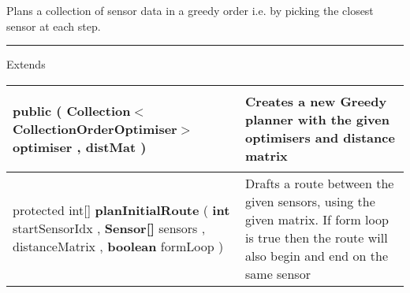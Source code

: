  {\scriptsize Plans a collection of sensor data in a greedy order\newline%
 i.e. by picking the closest sensor at each step.
 
\vspace*{4pt} \hrule \vspace*{3pt}
Extends \textbf{ \hyperref[tab:BaseCollectionOrderPlanner]{\color{blue}{BaseCollectionOrderPlanner}} }
\vspace*{-5pt} 
\begin{tabularx}{\linewidth}{m{}|m{}}
\label{tab:GreedyCollectionOrderPlanner}
\begin{raggedleft}public  \textbf{\hyperref[tab:GreedyCollectionOrderPlanner]{\color{blue}{GreedyCollectionOrderPlanner}} }(\newline \hfill 
\hspace*{ 5pt} \textbf{Collection$<$CollectionOrderOptimiser$>$} optimiser , \newline
 \hspace*{ 5pt} \textbf{\hyperref[tab:DistanceMatrix]{\color{blue}{DistanceMatrix}}} distMat  )
\end{raggedleft} &
 Creates a new Greedy planner with the given optimisers and distance matrix\\ \hline 
\begin{raggedleft}protected int{[}{]} \textbf{planInitialRoute }(\newline \hfill 
\hspace*{ 5pt} \textbf{int} startSensorIdx , \newline
 \hspace*{ 5pt} \textbf{Sensor{[}{]}} sensors , \newline
 \hspace*{ 5pt} \textbf{\hyperref[tab:DistanceMatrix]{\color{blue}{DistanceMatrix}}} distanceMatrix , \newline
 \hspace*{ 5pt} \textbf{boolean} formLoop  )
\end{raggedleft} &
 Drafts a route between the given sensors, using the given matrix. If form loop is true then the route will also begin and end on the same sensor\\\end{tabularx}
}
